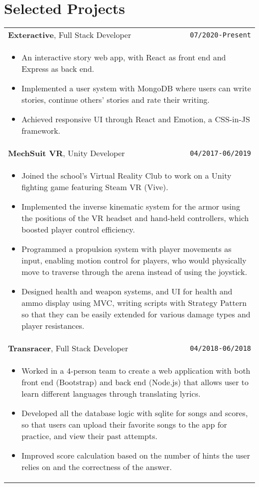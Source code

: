 \documentclass[10pt, letterpaper]{article}
\newcommand{\itemcols}[1]{
\multicolumn{2}{p{\dimexpr \linewidth-2\tabcolsep}}{
\begin{itemize}
#1
\end{itemize}
}
}
\begin{document}
\section{Selected Projects}
\smallskip
\noindent
\begin{tabularx}{\linewidth}{X r}
\textbf{\large Exteractive}, Full Stack Developer & \texttt{07/2020-Present} \\
\itemcols{
\item An interactive story web app, with React as front end and Express as back end.
\item Implemented a user system with MongoDB where users can write stories, continue others' stories and rate their writing.
\item Achieved responsive UI through React and Emotion, a CSS-in-JS framework.
} \\

\textbf{\large MechSuit VR}, Unity Developer & \texttt{04/2017-06/2019} \\
\itemcols{
\item Joined the school's Virtual Reality Club to work on a Unity fighting game featuring Steam VR (Vive).
\item Implemented the inverse kinematic system for the armor using the positions of the VR headset and hand-held controllers, which boosted player control efficiency.
\item Programmed a propulsion system with player movements as input, enabling motion control for players, who would physically move to traverse through the arena instead of using the joystick.
\item Designed health and weapon systems, and UI for health and ammo display using MVC, writing scripts with Strategy Pattern so that they can be easily extended for various damage types and player resistances.
} \\

\textbf{\large Transracer}, Full Stack Developer & \texttt{04/2018-06/2018} \\
\itemcols{
\item Worked in a 4-person team to create a web application with both front end (Bootstrap) and back end (Node.js) that allows user to learn different languages through translating lyrics.
\item Developed all the database logic with sqlite for songs and scores, so that users can upload their favorite songs to the app for practice, and view their past attempts.
\item Improved score calculation based on the number of hints the user relies on and the correctness of the answer.
} \\

\end{tabularx}
\end{document}
